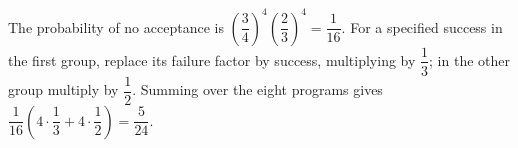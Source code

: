 The probability of no acceptance is $(\dfrac{3}{4})^4(\dfrac{2}{3})^4=\dfrac{1}{16}$. For a specified success in the first group, replace its failure factor by success, multiplying by $\dfrac{1}{3}$; in the other group multiply by $\dfrac{1}{2}$. Summing over the eight programs gives $\dfrac{1}{16}(4\cdot\dfrac{1}{3}+4\cdot\dfrac{1}{2})=\boxed{\dfrac{5}{24}}$.
